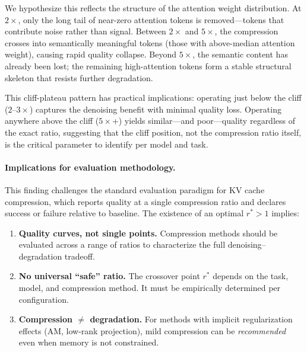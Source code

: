 We hypothesize this reflects the structure of the attention weight distribution. At $2\times$, only the long tail of near-zero attention tokens is removed---tokens that contribute noise rather than signal. Between $2\times$ and $5\times$, the compression crosses into semantically meaningful tokens (those with above-median attention weight), causing rapid quality collapse. Beyond $5\times$, the semantic content has already been lost; the remaining high-attention tokens form a stable structural skeleton that resists further degradation.

This cliff-plateau pattern has practical implications: operating just below the cliff ($2$--$3\times$) captures the denoising benefit with minimal quality loss. Operating anywhere above the cliff ($5\times$+) yields similar---and poor---quality regardless of the exact ratio, suggesting that the cliff position, not the compression ratio itself, is the critical parameter to identify per model and task.

\paragraph{Implications for evaluation methodology.}
This finding challenges the standard evaluation paradigm for KV cache compression, which reports quality at a single compression ratio and declares success or failure relative to baseline. The existence of an optimal $r^* > 1$ implies:

\begin{enumerate}
    \item \textbf{Quality curves, not single points.} Compression methods should be evaluated across a range of ratios to characterize the full denoising--degradation tradeoff.
    \item \textbf{No universal ``safe'' ratio.} The crossover point $r^*$ depends on the task, model, and compression method. It must be empirically determined per configuration.
    \item \textbf{Compression $\neq$ degradation.} For methods with implicit regularization effects (AM, low-rank projection), mild compression can be \emph{recommended} even when memory is not constrained.
\end{enumerate}
